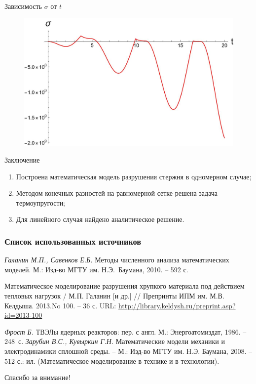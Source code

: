 \documentclass{beamer}
\begin{document}
\begin{frame}{Зависимость $\sigma$ от $t$ }
	\begin{figure}[H]
	\centering
	\includegraphics[width=1\textwidth]{T1_3}
\end{figure}
\end{frame}
	
	\begin{frame}{Заключение}
		\begin{enumerate}
			\Large
			\item Построена математическая модель разрушения стержня в одномерном случае;
			\item Методом конечных разностей на равномерной сетке решена задача термоупругости;
			\item Для линейного случая найдено аналитическое решение.
		\end{enumerate}
	\end{frame}
	
	
	\begin{frame}
		\frametitle{Список использованных источников}
		\begin{thebibliography}{9}
				
			 \textit{Галанин М.П., Савенков Е.Б.} Методы численного анализа математических моделей. М.: Изд-во МГТУ им. \mbox{Н.Э. Баумана},	2010. -- 592 с.
			
			 Математическое моделирование разрушения хрупкого материала под действием тепловых нагрузок / М.П. Галанин [и др.] // Препринты ИПМ им. М.В. Келдыша. 2013.No 100. -- 36 с. URL: \url{http://library.keldysh.ru/preprint.asp?id=2013-100}
		
			 \textit{Фрост Б.} ТВЭЛы ядерных реакторов: пер. с англ. М.: Энергоатомиздат, 1986. --
			\mbox{248 с.}
			 \textit{Зарубин В.С., Кувыркин Г.Н.} Математические модели механики и электродинамики сплошной среды. -- М.: Изд-во МГТУ им. Н.Э. Баумана, 2008. -- 512 с.: ил. (Математическое моделирование в технике и в технологии).
		
		\end{thebibliography}
	\end{frame}

\begin{frame}
\LARGE
\centering
Спасибо за внимание!
\end{frame}
	
	
	
\end{document}
